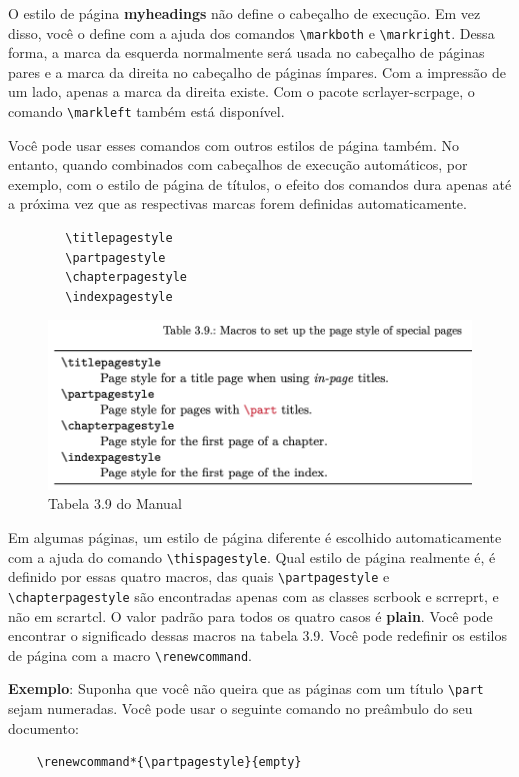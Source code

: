 O estilo de página \textbf{myheadings} não define o cabeçalho de execução. Em vez disso, você o define com a ajuda dos comandos \verb|\markboth| e \verb|\markright|. Dessa forma, a marca da esquerda normalmente será usada no cabeçalho de páginas pares e a marca da direita no cabeçalho de páginas ímpares. Com a impressão de um lado, apenas a marca da direita existe. Com o pacote scrlayer-scrpage, o comando \verb|\markleft| também está disponível.

Você pode usar esses comandos com outros estilos de página também. No entanto, quando combinados com cabeçalhos de execução automáticos, por exemplo, com o estilo de página de títulos, o efeito dos comandos dura apenas até a próxima vez que as respectivas marcas forem definidas automaticamente.
\begin{verbatim}
        \titlepagestyle
        \partpagestyle
        \chapterpagestyle
        \indexpagestyle
\end{verbatim}

\begin{figure}[ht]
    \centering
    \includegraphics[width=0.75\linewidth]{tab3_9.png}
    \caption{Tabela 3.9 do Manual}
    \label{fig:tab3_9}
\end{figure}

Em algumas páginas, um estilo de página diferente é escolhido automaticamente com a ajuda do comando \verb|\thispagestyle|. Qual estilo de página realmente é, é definido por essas quatro macros, das quais \verb|\partpagestyle| e \verb|\chapterpagestyle| são encontradas apenas com as classes scrbook e scrreprt, e não em scrartcl. O valor padrão para todos os quatro casos é \textbf{plain}. Você pode encontrar o significado dessas macros  na tabela 3.9. Você pode redefinir os estilos de página com a macro \verb|\renewcommand|.

\textbf{Exemplo}: Suponha que você não queira que as páginas com um título \verb|\part| sejam numeradas. Você pode usar o seguinte comando no preâmbulo do seu documento:
\begin{verbatim}
    \renewcommand*{\partpagestyle}{empty}
\end{verbatim}

